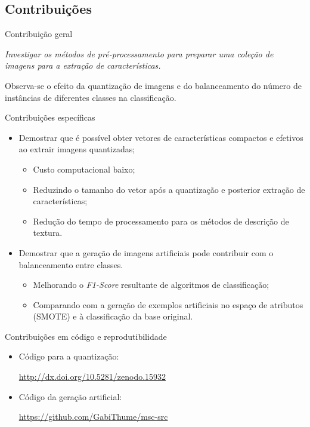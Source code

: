 \documentclass{beamer}
\begin{document}
\subsection{Contribuições}
\begin{frame}{Contribuição geral}
\setlength\leftmargini{1em}
\justifying
  \begin{block}{}
  \justifying
  \emph{Investigar os métodos de pré-processamento para preparar uma coleção de imagens para a extração de características.}

  \vspace{5mm}
  Observa-se o efeito da quantização de imagens e do balanceamento do número de instâncias de diferentes classes na classificação.
  \end{block}
\end{frame}
\begin{frame}{Contribuições específicas}
\setlength\leftmargini{1em}
\justifying
    \begin{itemize}
      \item Demostrar que é possível obter vetores de características compactos e efetivos ao extrair imagens quantizadas;
      \begin{itemize}
        \item Custo computacional baixo;
        \item Reduzindo o tamanho do vetor após a quantização e posterior extração de características;
        \item Redução do tempo de processamento para os métodos de descrição de textura.
      \end{itemize}
      \pause
      \item Demostrar que a geração de imagens artificiais pode contribuir com o balanceamento entre classes.
        \begin{itemize}
          \item Melhorando o \textit{F1-Score} resultante de algoritmos de classificação;
          \item Comparando com a geração de exemplos artificiais no espaço de atributos (SMOTE) e à classificação da base original.
        \end{itemize}
    \end{itemize}
\end{frame}
\begin{frame}{Contribuições em código e reprodutibilidade}
  \setlength\leftmargini{1em}
  \justifying
  \begin{itemize}
    \item Código para a quantização:
    \begin{center}
     \small{\url{http://dx.doi.org/10.5281/zenodo.15932}}
    \end{center}
    \item Código da geração artificial:
    \begin{center}
    \small{\url{https://github.com/GabiThume/msc-src}}
  \end{center}
  \end{itemize}
\end{frame}
\end{document}
